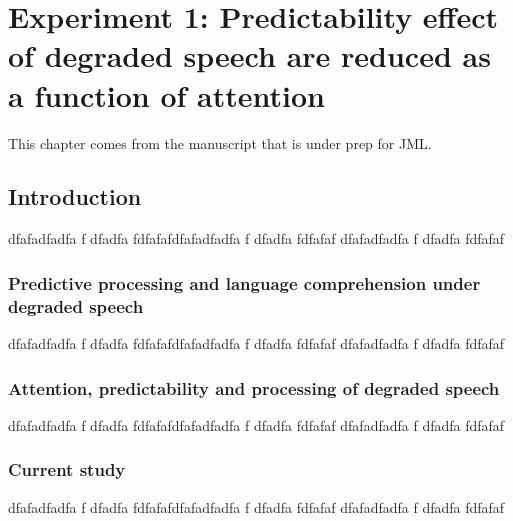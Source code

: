 \documentclass[a4paper, nobind]{templates/ociamthesis}
\begin{document}
\minitoc 

\hypertarget{experiment-1-predictability-effect-of-degraded-speech-are-reduced-as-a-function-of-attention}{%
\chapter{Experiment 1: Predictability effect of degraded speech are reduced as a function of attention}\label{experiment-1-predictability-effect-of-degraded-speech-are-reduced-as-a-function-of-attention}}

\minitoc 

\noindent This chapter comes from the manuscript that is under prep for JML.

\hypertarget{introduction}{%
\section{Introduction}\label{introduction}}

dfafadfadfa f
dfadfa
fdfafafdfafadfadfa f
dfadfa
fdfafaf
dfafadfadfa f
dfadfa
fdfafaf

\hypertarget{predictive-processing-and-language-comprehension-under-degraded-speech}{%
\subsection{Predictive processing and language comprehension under degraded speech}\label{predictive-processing-and-language-comprehension-under-degraded-speech}}

dfafadfadfa f
dfadfa
fdfafafdfafadfadfa f
dfadfa
fdfafaf
dfafadfadfa f
dfadfa
fdfafaf

\hypertarget{attention-predictability-and-processing-of-degraded-speech}{%
\subsection{Attention, predictability and processing of degraded speech}\label{attention-predictability-and-processing-of-degraded-speech}}

dfafadfadfa f
dfadfa
fdfafafdfafadfadfa f
dfadfa
fdfafaf
dfafadfadfa f
dfadfa
fdfafaf

\hypertarget{current-study}{%
\subsection{Current study}\label{current-study}}

dfafadfadfa f
dfadfa
fdfafafdfafadfadfa f
dfadfa
fdfafaf
dfafadfadfa f
dfadfa
fdfafaf
\end{document}
